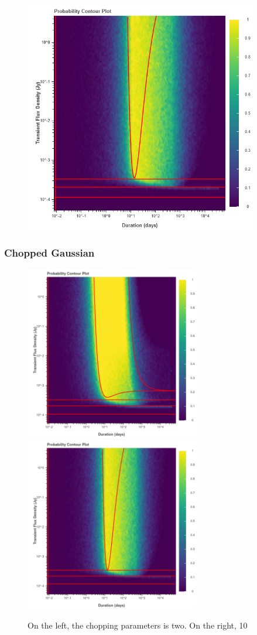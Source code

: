 \documentclass{article}
\begin{document}
\begin{figure}[H] 
	\begin{center}
		\includegraphics[width=4in]{output_gaussian_ProbContour.png}
		
		\label{gaussian}
	\end{center}
\end{figure}
\subsubsection{Chopped Gaussian}
\begin{figure}[htp] 
	\centering
		\includegraphics[width=3in]{output_choppedgaussian_ProbContour2.png}
		\includegraphics[width=3in]{output_choppedgaussian_ProbContour10.png}
		\label{choppedgaussian}
		\caption{On the left, the chopping parameters is two. On the right, 10}

\end{figure}
\end{document}
